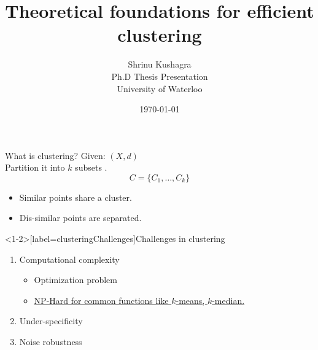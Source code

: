 \documentclass{beamer}
\title[Efficient Clustering]{Theoretical foundations for efficient clustering}
\author[S. Kushagra]{
Shrinu Kushagra\\
\vspace{30pt}Ph.D Thesis Presentation\\
University of Waterloo
}
\date{\today}
\begin{document}
\begin{frame}
  \titlepage
\end{frame}

\begin{frame}{What is clustering?}
	Given: $(X, d)$\\
	\vspace{10pt}Partition it into $k$ subsets .$$C = \{C_1, \ldots, C_k\}$$
	\begin{itemize}
		\item Similar points share a cluster.
		\item Dis-similar points are separated.
	\end{itemize}
\end{frame}

\begin{frame}<1-2>[label=clusteringChallenges]{Challenges in clustering}
	\begin{enumerate}
		 \item Computational complexity
			\begin{itemize}
				\vspace{10pt}\item Optimization problem 
				\vspace{10pt}\item \hyperlink{notesIntroduction}{NP-Hard for common functions like $k$-means, $k$-median.}
			\end{itemize}
		 \vspace{20pt}\item  Under-specificity
		\onslide<3>\vspace{20pt}\item Noise robustness
	\end{enumerate}

\end{frame}
\end{document}

